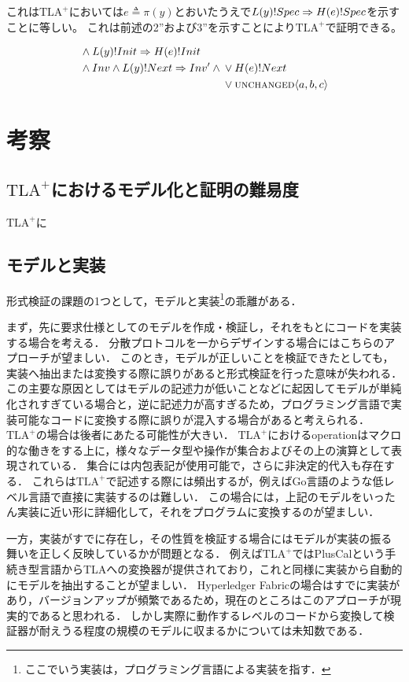 \documentclass{fose2019}           %
\newcommand{\TLA}{$\text{TLA}^{+}$}
\begin{document}
これは\TLA においては$e \triangleq \pi(y)$とおいたうえで$L(y)!Spec \Rightarrow H(e)!Spec$を示すことに等しい。
これは前述の2''および3''を示すことにより\TLA で証明できる。

\begin{alignat}{2}
{} &\land L(y)!Init \Rightarrow H(e)!Init \\
{} &\land Inv \land L(y)!Next \Rightarrow Inv' \land \begin{aligned}[t]
	{}&\lor H(e)!Next \\
	{}&\lor \textsc{unchanged}\langle a,b,c \rangle
	\end{aligned}
\end{alignat}

\section{考察}

\subsection{\TLA におけるモデル化と証明の難易度}
\TLA に

\subsection{モデルと実装}

形式検証の課題の1つとして，モデルと実装\footnote{ここでいう実装は，プログラミング言語による実装を指す．}の乖離がある．

まず，先に要求仕様としてのモデルを作成・検証し，それをもとにコードを実装する場合を考える．
分散プロトコルを一からデザインする場合にはこちらのアプローチが望ましい．
このとき，モデルが正しいことを検証できたとしても，実装へ抽出または変換する際に誤りがあると形式検証を行った意味が失われる．
この主要な原因としてはモデルの記述力が低いことなどに起因してモデルが単純化されすぎている場合と，逆に記述力が高すぎるため，プログラミング言語で実装可能なコードに変換する際に誤りが混入する場合があると考えられる．
\TLA の場合は後者にあたる可能性が大きい．
\TLA におけるoperationはマクロ的な働きをする上に，様々なデータ型や操作が集合およびその上の演算として表現されている．
集合には内包表記が使用可能で，さらに非決定的代入も存在する．
これらは\TLA で記述する際には頻出するが，例えばGo言語のような低レベル言語で直接に実装するのは難しい．
この場合には，上記のモデルをいったん実装に近い形に詳細化して，それをプログラムに変換するのが望ましい．

一方，実装がすでに存在し，その性質を検証する場合にはモデルが実装の振る舞いを正しく反映しているかが問題となる．
例えば\TLA ではPlusCalという手続き型言語からTLAへの変換器が提供されており，これと同様に実装から自動的にモデルを抽出することが望ましい．
Hyperledger Fabricの場合はすでに実装があり，バージョンアップが頻繁であるため，現在のところはこのアプローチが現実的であると思われる．
しかし実際に動作するレベルのコードから変換して検証器が耐えうる程度の規模のモデルに収まるかについては未知数である．
\end{document}
